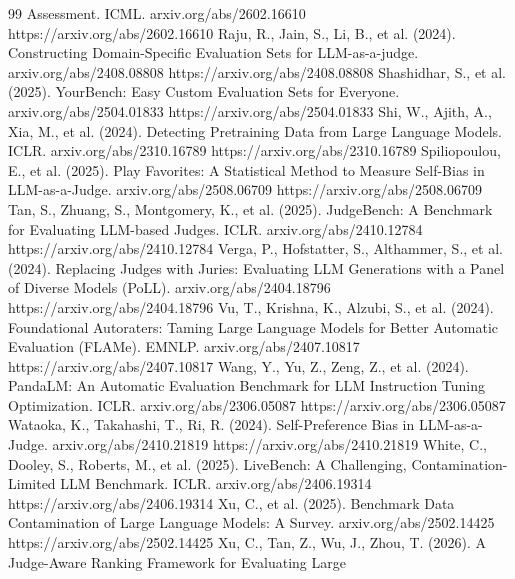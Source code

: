 \documentclass[11pt,a4paper]{article}
\begin{document}
\begin{thebibliography}{99}
    Assessment. ICML. arxiv.org/abs/2602.16610 https://arxiv.org/abs/2602.16610
\label{r25} Raju, R., Jain, S., Li, B., et al. (2024). Constructing Domain-Specific Evaluation Sets for
    LLM-as-a-judge. arxiv.org/abs/2408.08808 https://arxiv.org/abs/2408.08808
\label{r11} Shashidhar, S., et al. (2025). YourBench: Easy Custom Evaluation Sets for Everyone. arxiv.org/abs/2504.01833 https://arxiv.org/abs/2504.01833
\label{r36} Shi, W., Ajith, A., Xia, M., et al. (2024). Detecting Pretraining Data from Large Language
    Models. ICLR. arxiv.org/abs/2310.16789 https://arxiv.org/abs/2310.16789
\label{r16} Spiliopoulou, E., et al. (2025). Play Favorites: A Statistical Method to Measure Self-Bias in
    LLM-as-a-Judge. arxiv.org/abs/2508.06709 https://arxiv.org/abs/2508.06709
\label{r6} Tan, S., Zhuang, S., Montgomery, K., et al. (2025). JudgeBench: A Benchmark for Evaluating LLM-based
    Judges. ICLR. arxiv.org/abs/2410.12784 https://arxiv.org/abs/2410.12784
\label{r5} Verga, P., Hofstatter, S., Althammer, S., et al. (2024). Replacing Judges with Juries: Evaluating LLM
    Generations with a Panel of Diverse Models (PoLL). arxiv.org/abs/2404.18796 https://arxiv.org/abs/2404.18796
\label{r4} Vu, T., Krishna, K., Alzubi, S., et al. (2024). Foundational Autoraters: Taming Large Language Models
    for Better Automatic Evaluation (FLAMe). EMNLP. arxiv.org/abs/2407.10817 https://arxiv.org/abs/2407.10817
\label{r34} Wang, Y., Yu, Z., Zeng, Z., et al. (2024). PandaLM: An Automatic Evaluation Benchmark for LLM
    Instruction Tuning Optimization. ICLR. arxiv.org/abs/2306.05087 https://arxiv.org/abs/2306.05087
\label{r18} Wataoka, K., Takahashi, T., Ri, R. (2024). Self-Preference Bias in LLM-as-a-Judge. arxiv.org/abs/2410.21819 https://arxiv.org/abs/2410.21819
\label{r22} White, C., Dooley, S., Roberts, M., et al. (2025). LiveBench: A Challenging, Contamination-Limited
    LLM Benchmark. ICLR. arxiv.org/abs/2406.19314 https://arxiv.org/abs/2406.19314
\label{r13} Xu, C., et al. (2025). Benchmark Data Contamination of Large Language Models: A Survey. arxiv.org/abs/2502.14425 https://arxiv.org/abs/2502.14425
\label{r29} Xu, C., Tan, Z., Wu, J., Zhou, T. (2026). A Judge-Aware Ranking Framework for Evaluating Large

\end{thebibliography}
\end{document}
